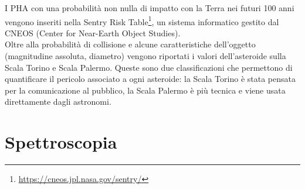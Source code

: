 I PHA con una probabilità non nulla di impatto con la Terra nei futuri 100 anni vengono inseriti nella Sentry Risk Table\footnote{\href {https://cneos.jpl.nasa.gov/sentry/}{https://cneos.jpl.nasa.gov/sentry/} }, un sistema informatico gestito dal CNEOS (Center for Near-Earth Object Studies).\\
Oltre alla probabilità di collisione e alcune caratteristiche dell’oggetto (magnitudine assoluta, diametro) vengono riportati i valori dell’asteroide sulla Scala Torino e Scala Palermo. Queste sono due classificazioni che permettono di quantificare il pericolo associato a ogni asteroide: la Scala Torino è stata pensata per la comunicazione al pubblico, la Scala Palermo è più tecnica e viene usata direttamente dagli astronomi.


\chapter{Spettroscopia}\label{ch:ch_2}

